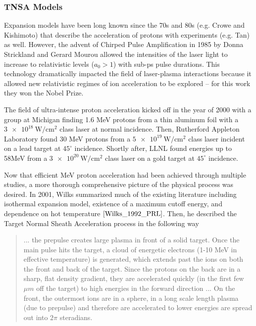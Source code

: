 \subsubsection{TNSA Models}

Expansion models have been long known since the 70s and 80s (e.g. Crowe\cite{Crow_1975_JPP} and Kishimoto\cite{Kishimoto_1983_PoF}) that describe the acceleration of protons with experiments (e.g. Tan\cite{Tan_1984_PoF}) as well. However, the advent of Chirped Pulse Amplification\cite{Strickland_1985_Optics} in 1985 by Donna Strickland and Gerard Mourou allowed the intensities of the laser light to increase to relativistic levels ($a_0 > 1$) with sub-ps pulse durations. This technology dramatically impacted the field of laser-plasma interactions because it allowed new relativistic regimes of ion acceleration to be explored -- for this work they won the Nobel Prize\cite{Nobel_2018}. 

The field of ultra-intense proton acceleration kicked off in the year of 2000 with a group at Michigan\cite{Maksimchuk_2000_PRL} finding 1.6 MeV protons from a thin aluminum foil with a $\SI{3e18}{\watt \per \centi \meter \squared}$ class laser at normal incidence. Then, Rutherford Appleton Laboratory found 30 MeV protons\cite{Clark_2000_PRL} from a $\SI{5e19}{\watt \per \centi \meter \squared}$ class laser incident on a lead target at $45^\circ$ incidence. Shortly after, LLNL found energies up to 58MeV\cite{Snavely_2000_PRL} from a $\SI{3e20}{\watt \per \centi \meter \squared}$ class laser on a gold target at $45^\circ$ incidence.

Now that efficient MeV proton acceleration had been achieved through multiple studies, a more thorough comprehensive picture of the physical process was desired. In 2001, Wilks\cite{Wilks_2001_PoP} summarized much of the existing literature including isothermal expansion model\cite{Crow_1975_JPP}, existence of a maximum cutoff energy\cite{Kishimoto_1983_PoF}, and dependence on hot temperature $\cite{Wilks_1992_PRL}$. Then, he described the Target Normal Sheath Acceleration process in the following way\cite{Wilks_2001_PoP}

\begin{quote}
	... the prepulse creates large plasma in front of a solid target. Once the main pulse hits the target, a cloud of energetic electrons (1-10 MeV in effective temperature) is generated, which extends past the ions on both the front and back of the target. Since the protons on the back are in a sharp, flat density gradient, they are accelerated quickly (in the first few $\mu m$ off the target) to high energies in the forward direction ... On the front, the outermost ions are in a sphere, in a long scale length plasma (due to prepulse) and therefore are accelerated to lower energies are spread out into $2 \pi$ steradians.
\end{quote}

